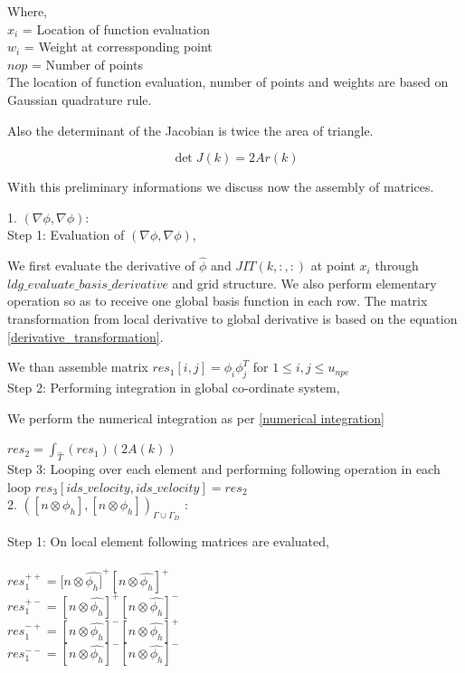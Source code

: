 \documentclass[a4paper,12pt]{book}
\begin{document}
Where, \\

$x_i$ = Location of function evaluation\\
$w_i$ = Weight at corressponding point\\
$nop$ = Number of points\\

The location of function evaluation, number of points and weights are based on Gaussian quadrature rule.

Also the determinant of the Jacobian is twice the area of triangle.

\begin{equation}\label{determinant to area}
\det J(k) = 2Ar(k)
\end{equation}

With this preliminary informations we discuss now the assembly of matrices.

1. $(\nabla \phi, \nabla \phi)$:\\

Step 1: Evaluation of $(\nabla \phi , \nabla \phi)$,

We first evaluate the derivative of $\hat{\phi}$ and $JIT(k,:,:)$ at point $x_i$ through $ldg\_evaluate\_basis\_derivative$ and grid structure. We also perform elementary operation so as to receive one global basis function in each row. The matrix transformation from local derivative to global derivative is based on the equation \ref{derivative_transformation}.

We than assemble matrix $res_1[i,j]=\phi_i \phi_j^T$ for $1 \leq i,j \leq u_{npe}$\\

Step 2: Performing integration in global co-ordinate system,

We perform the numerical integration as per \ref{numerical integration} 

$res_2 = \int_{\hat{T}} (res_1) (2 A(k))$\\

Step 3: Looping over each element and performing following operation in each loop $res_3[ids\_velocity,ids\_velocity]=res_2$\\


2. $([n \otimes \phi_h], [n \otimes \phi_h])_{\Gamma \cup \Gamma_D}$ :

Step 1: On local element following matrices are evaluated,\\
\\
$res_1^{++} = [n \otimes \hat{\phi_h]}^+ [n \otimes \hat{\phi_h}]^+$\\
$res_1^{+-} = [n \otimes \hat{\phi_h}]^+ [n \otimes \hat{\phi_h}]^-$\\
$res_1^{-+} = [n \otimes \hat{\phi_h}]^- [n \otimes \hat{\phi_h}]^+$\\
$res_1^{--} = [n \otimes \hat{\phi_h}]^- [n \otimes \hat{\phi_h}]^-$\\
\end{document}
